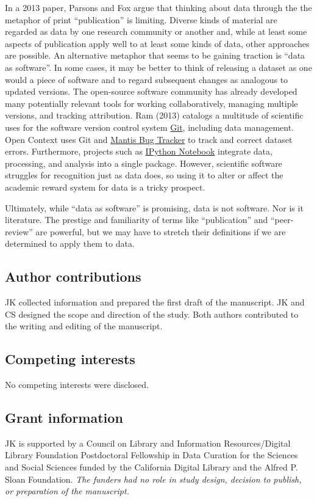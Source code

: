 \documentclass[10pt,a4paper,twocolumn]{article}
\begin{document}
{In a 2013 paper\cite{parsons_is_2013}, Parsons and Fox argue that thinking about data through the the metaphor of print ``publication'' is limiting.
Diverse kinds of material are regarded as data by one research community or another and, while at least some aspects of publication apply well to at least some kinds of data, other approaches are possible.
An alternative metaphor that seems to be gaining traction is ``data as software''\cite{schopf_treating_2012}.
In some cases, it may be better to think of releasing a dataset as one would a piece of software and to regard subsequent changes as analogous to updated versions.
The open-source software community has already developed many potentially relevant tools for working collaboratively, managing multiple versions, and tracking attribution.
Ram (2013)\cite{ram_git_2013} catalogs a multitude of scientific uses for the software version control system \href{http://git-scm.com/}{Git}, including data management.
Open Context uses Git and \href{http://www.mantisbt.org/}{Mantis Bug Tracker} to track and correct dataset errors.
Furthermore, projects such as \href{http://ipython.org/notebook}{IPython Notebook} integrate data, processing, and analysis into a single package.
However, scientific software struggles for recognition\cite{pradal_publishing_2013} just as data does, so using it to alter or affect the academic reward system for data is a tricky prospect.

Ultimately, while ``data as software'' is promising, data is not software.
Nor is it literature. 
The prestige and familiarity of terms like ``publication'' and ``peer-review'' are powerful, but we may have to stretch their definitions if we are determined to apply them to data.


\subsection*{Author contributions}
JK collected information and prepared the first draft of the manuscript.
JK and CS designed the scope and direction of the study.
Both authors contributed to the writing and editing of the manuscript.

\subsection*{Competing interests}
No competing interests were disclosed.

\subsection*{Grant information}
JK is supported by a Council on Library and Information Resources/Digital Library Foundation Postdoctoral Fellowship in Data Curation for the Sciences and Social Sciences funded by the California Digital Library and the Alfred P. Sloan Foundation.
\emph{The funders had no role in study design, decision to publish, or preparation of the manuscript.}

}
\end{document}
